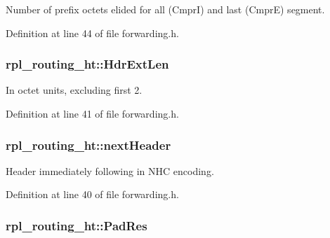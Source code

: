 Number of prefix octets elided for all (CmprI) and last (CmprE) segment. 



Definition at line 44 of file forwarding.\+h.

\subsubsection[{\texorpdfstring{Hdr\+Ext\+Len}{HdrExtLen}}]{ rpl\+\_\+routing\+\_\+ht\+::\+Hdr\+Ext\+Len}\hypertarget{structrpl__routing__ht_a1e766c282c888be7cb810454e550a256}{}\label{structrpl__routing__ht_a1e766c282c888be7cb810454e550a256}


In octet units, excluding first 2. 



Definition at line 41 of file forwarding.\+h.

\subsubsection[{\texorpdfstring{next\+Header}{nextHeader}}]{ rpl\+\_\+routing\+\_\+ht\+::next\+Header}\hypertarget{structrpl__routing__ht_a6d629e14f23a486e842b2e7a99b6a8f7}{}\label{structrpl__routing__ht_a6d629e14f23a486e842b2e7a99b6a8f7}


Header immediately following in N\+HC encoding. 



Definition at line 40 of file forwarding.\+h.

\subsubsection[{\texorpdfstring{Pad\+Res}{PadRes}}]{ rpl\+\_\+routing\+\_\+ht\+::\+Pad\+Res}\hypertarget{structrpl__routing__ht_aa8867cb35ef8f58b70a2645ac1430570}{}\label{structrpl__routing__ht_aa8867cb35ef8f58b70a2645ac1430570}


